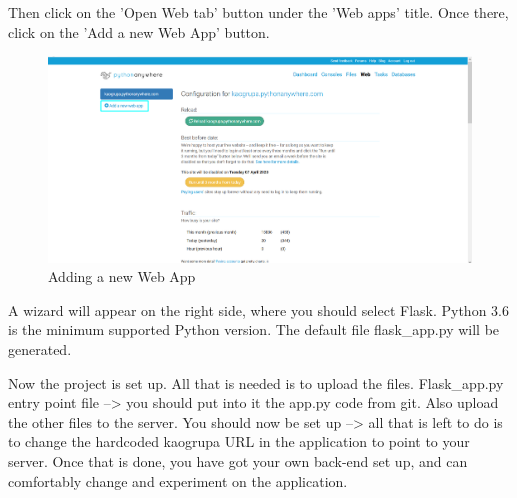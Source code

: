 				Then click on the 'Open Web tab' button under the 'Web apps' title. Once there, click on the 'Add a new Web App' button.
				\begin{figure}[H]
					\includegraphics[width=\linewidth]{images/Deploy_3.png}
					\caption{Adding a new Web App}
					\label{fig:deployment_3}
				\end{figure}
				
				A wizard will appear on the right side, where you should select Flask. Python 3.6 is the minimum supported Python version. The default file flask\_app.py will be generated. 
				
				Now the project is set up. All that is needed is to upload the files. Flask\_app.py entry point file --> you should put into it the app.py code from git. Also upload the other files to the server. You should now be set up --> all that is left to do is to change the hardcoded kaogrupa URL in the application to point to your server. Once that is done, you have got your own back-end set up, and can comfortably change and experiment on the application.
				
